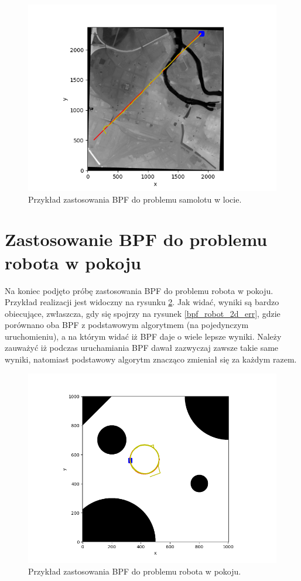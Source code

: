 \begin{figure}[H]
	\begin{center}
		\includegraphics[width=15cm]{./bpf_plane_wro.png}
		\caption{Przykład zastosowania BPF do problemu samolotu w locie.}
		\label{bpf_plane_wro}
	\end{center}
\end{figure}


\section{Zastosowanie BPF do problemu robota w pokoju}
Na koniec podjęto próbę zastosowania BPF do problemu robota w pokoju. Przykład realizacji jest widoczny na rysunku \ref{bpf_robot_2d}. Jak widać, wyniki są bardzo obiecujące, zwłaszcza, gdy się spojrzy na rysunek \ref{bpf_robot_2d_err}, gdzie porównano oba BPF z podstawowym algorytmem (na pojedynczym uruchomieniu), a na którym widać iż BPF daje o wiele lepsze wyniki. Należy zauważyć iż podczas uruchamiania BPF dawał zazwyczaj zawsze takie same wyniki, natomiast podstawowy algorytm znacząco zmieniał się za każdym razem.
\begin{figure}[H]
	\begin{center}
		\includegraphics[width=12cm]{./bpf_robot_2d.png}
		\caption{Przykład zastosowania BPF do problemu robota w pokoju.}
		\label{bpf_robot_2d}
	\end{center}
\end{figure}

